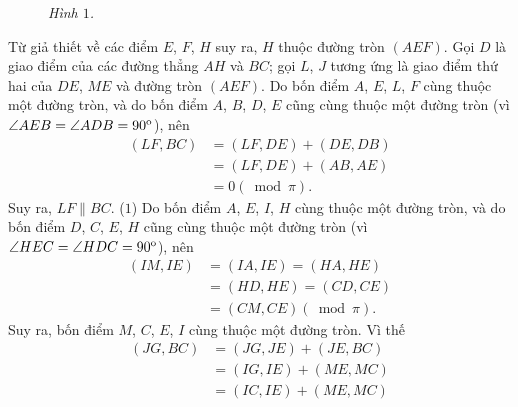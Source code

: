\begin{multicols}{2}
\begin{figure}[H]
		\caption{\small\textit{\color{thachthuctoanhoc}Hình $1$.}}
		\vspace*{-10pt}
	\end{figure}
	Từ giả thiết về các điểm $E$, $F$, $H$ suy ra, $H$ thuộc đường tròn $(AEF)$.
	\vskip 0.05cm
	Gọi $D$ là giao điểm của các đường thẳng $AH$ và $BC$; gọi $L$, $J$ tương ứng là giao điểm thứ hai của $DE$, $ME$ và đường tròn $(AEF)$.
	\vskip 0.05cm
	Do bốn điểm $A$, $E$, $L$, $F$ cùng thuộc một đường tròn, và do bốn điểm $A$, $B$, $D$, $E$ cũng cùng thuộc một đường tròn (vì $\angle AEB = \angle ADB = {90^{\rm{o}}}$), nên
	\begin{align*}
		\left( {LF,BC} \right) &= \left( {LF,DE} \right) + \left( {DE,DB} \right) \\
		&= \left( {LF,DE} \right) + \left( {AB,AE} \right) \\
		&= 0\left( {\bmod \pi } \right).
	\end{align*}
	Suy ra, $LF \parallel BC$. \hfill ($1$)
	\vskip 0.05cm
	Do bốn điểm $A$, $E$, $I$, $H$ cùng thuộc một đường tròn, và do bốn điểm $D$, $C$, $E$, $H$ cũng cùng thuộc một đường tròn (vì $\angle HEC = \angle HDC = {90^{\rm{o}}}$), nên
	\begin{align*}
		\left( {IM,IE} \right) &= \left( {IA,IE} \right) = \left( {HA,HE} \right) \\
		&= \left( {HD,HE} \right) = \left( {CD,CE} \right) \\
		&= \left( {CM,CE} \right)\left( {\bmod \pi } \right).
	\end{align*}
	Suy ra, bốn điểm $M$, $C$, $E$, $I$ cùng thuộc một đường tròn. Vì thế
	\begin{align*}
		\left( {JG,BC} \right) &= \left( {JG,JE} \right) + \left( {JE,BC} \right) \\
		&= \left( {IG,IE} \right) + \left( {ME,MC} \right) \\
		&= \left( {IC,IE} \right) + \left( {ME,MC} \right) \\

\end{align*}
\end{multicols}
